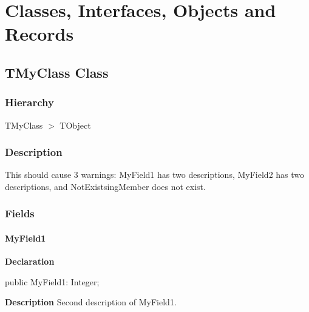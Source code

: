 \documentclass{report}
\begin{document}
\section{Classes, Interfaces, Objects and Records}
\subsection*{TMyClass Class}
\subsubsection*{\large{\textbf{Hierarchy}}\normalsize\hspace{1ex}\hfill}
TMyClass {$>$} TObject
\subsubsection*{\large{\textbf{Description}}\normalsize\hspace{1ex}\hfill}


 



This should cause 3 warnings: MyField1 has two descriptions, MyField2 has two descriptions, and NotExistsingMember does not exist.\subsubsection*{\large{\textbf{Fields}}\normalsize\hspace{1ex}\hfill}
\paragraph*{MyField1}\hspace*{\fill}

\begin{list}{}{
\setlength{\itemindent}{0cm}
\setlength{\listparindent}{0cm}
\setlength{\leftmargin}{\evensidemargin}
\addtolength{\leftmargin}{\tmplength}
\settowidth{\labelsep}{X}
\addtolength{\leftmargin}{\labelsep}
\setlength{\labelwidth}{\tmplength}
}
\begin{flushleft}
\item[\textbf{Declaration}\hfill]
\begin{ttfamily}
public MyField1: Integer;\end{ttfamily}


\end{flushleft}
\par
\item[\textbf{Description}]
Second description of MyField1.

\end{list}
\end{document}
